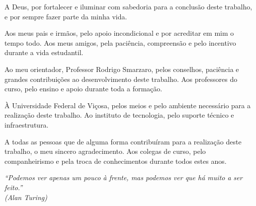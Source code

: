 \documentclass[
    12pt,
    openright,
    oneside,
    a4paper,
    sumario=tradicional,
    english,
    brazil,
    ]{abntex2}
\begin{document}
\frenchspacing

\pretextual

\imprimircapa
\imprimirfolhaderosto
\imprimirfolhadeaprovacao

\begin{agradecimentos}
    A Deus, por fortalecer e iluminar com sabedoria para a conclusão deste trabalho, e por sempre fazer parte da minha vida.

    Aos meus pais e irmãos, pelo apoio incondicional e por acreditar em mim o tempo todo.
    Aos meus amigos, pela paciência, compreensão e pelo incentivo durante a vida estudantil.

    Ao meu orientador, Professor Rodrigo Smarzaro, pelos conselhos, paciência e grandes contribuições ao desenvolvimento deste trabalho.
    Aos professores do curso, pelo ensino e apoio durante toda a formação.

    À Universidade Federal de Viçosa, pelos meios e pelo ambiente necessário para a realização deste trabalho.
    Ao instituto de tecnologia, pelo suporte técnico e infraestrutura.

    A todas as pessoas que de alguma forma contribuíram para a realização deste trabalho, o meu sincero agradecimento.
    Aos colegas de curso, pelo companheirismo e pela troca de conhecimentos durante todos estes anos.
\end{agradecimentos}

\begin{epigrafe}
    \vspace*{\fill}
    \begin{flushright}
        \textit{``Podemos ver apenas um pouco à frente, mas podemos ver que há muito a ser feito.''\\
        (Alan Turing)}
    \end{flushright}
\end{epigrafe}

\end{document}
